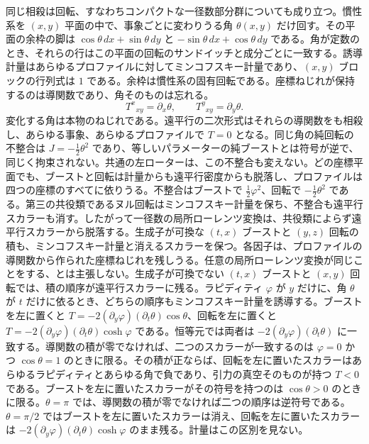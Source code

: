 \documentclass[a4paper]{article}
\begin{document}
同じ相殺は回転、すなわちコンパクトな一径数部分群についても成り立つ。慣性系を $(x,y)$ 平面の中で、事象ごとに変わりうる角 $\theta(x,y)$ だけ回す。その平面の余枠の脚は $\cos\theta\,dx+\sin\theta\,dy$ と $-\sin\theta\,dx+\cos\theta\,dy$ である。角が定数のとき、それらの行はこの平面の回転のサンドイッチと成分ごとに一致する。誘導計量はあらゆるプロファイルに対してミンコフスキー計量であり、$(x,y)$ ブロックの行列式は $1$ である。余枠は慣性系の固有回転である。座標ねじれが保持するのは導関数であり、角そのものは忘れる。
\[
T^x{}_{xy}=\partial_x\theta,\qquad T^y{}_{xy}=\partial_y\theta.
\]
変化する角は本物のねじれである。遠平行の二次形式はそれらの導関数をも相殺し、あらゆる事象、あらゆるプロファイルで $T=0$ となる。同じ角の純回転の不整合は $J=-\tfrac12\theta^2$ であり、等しいパラメーターの純ブーストとは符号が逆で、同じく拘束されない。共通の左ローターは、この不整合も変えない。どの座標平面でも、ブーストと回転は計量からも遠平行密度からも脱落し、プロファイルは四つの座標のすべてに依りうる。不整合はブーストで $\tfrac12\varphi^2$、回転で $-\tfrac12\theta^2$ である。第三の共役類であるヌル回転はミンコフスキー計量を保ち、不整合も遠平行スカラーも消す。したがって一径数の局所ローレンツ変換は、共役類によらず遠平行スカラーから脱落する。生成子が可換な $(t,x)$ ブーストと $(y,z)$ 回転の積も、ミンコフスキー計量と消えるスカラーを保つ。各因子は、プロファイルの導関数から作られた座標ねじれを残しうる。任意の局所ローレンツ変換が同じことをする、とは主張しない。生成子が可換でない $(t,x)$ ブーストと $(x,y)$ 回転では、積の順序が遠平行スカラーに残る。ラピディティ $\varphi$ が $y$ だけに、角 $\theta$ が $t$ だけに依るとき、どちらの順序もミンコフスキー計量を誘導する。ブーストを左に置くと $T=-2(\partial_y\varphi)(\partial_t\theta)\cos\theta$、回転を左に置くと $T=-2(\partial_y\varphi)(\partial_t\theta)\cosh\varphi$ である。恒等元では両者は $-2(\partial_y\varphi)(\partial_t\theta)$ に一致する。導関数の積が零でなければ、二つのスカラーが一致するのは $\varphi=0$ かつ $\cos\theta=1$ のときに限る。その積が正ならば、回転を左に置いたスカラーはあらゆるラピディティとあらゆる角で負であり、引力の真空そのものが持つ $T<0$ である。ブーストを左に置いたスカラーがその符号を持つのは $\cos\theta>0$ のときに限る。$\theta=\pi$ では、導関数の積が零でなければ二つの順序は逆符号である。$\theta=\pi/2$ ではブーストを左に置いたスカラーは消え、回転を左に置いたスカラーは $-2(\partial_y\varphi)(\partial_t\theta)\cosh\varphi$ のまま残る。計量はこの区別を見ない。
\end{document}

